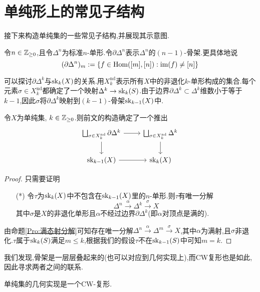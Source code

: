 \section{单纯形上的常见子结构}
接下来构造单纯集的一些常见子结构,并展现其示意图.
\begin{definition}
    令$n \in \mathbb{Z}_{\geq 0}$,且令$\Delta^n$为标准$n$-单形.令$\partial \Delta^n$表示$\Delta^n$的$(n-1)$-骨架.更具体地说
    \[
    (\partial \Delta^n)_m := \{f\in \operatorname{Hom}([m],[n]) : \operatorname{im} (f) \neq [n]\}
    \]
\end{definition}
可以探讨$\partial \Delta^k$与$\operatorname{sk}_k(X)$的关系.用$X^{\operatorname{nd}}_k$表示所有$X$中的非退化$k$-单形构成的集合.每个元素$\sigma \in X^{\operatorname{nd}}_k$都确定了一个映射$\Delta^k \to \operatorname{sk}_k(S)$.由于边界$\partial \Delta^k\subset \Delta^k$维数小于等于$k-1$,因此$\sigma$将$\partial \Delta^k$映射到$(k-1)$-骨架$\operatorname{sk}_{k-1}(X)$中.
\begin{proposition}\label{命题:骨架构造}
    令$X$为单纯集, $k \in \mathbb{Z}_{\geq 0}$.则前文的构造确定了一个推出
    \[\begin{tikzcd}
	{\bigsqcup_{\sigma\in X_k^{\operatorname{nd}}}\partial\Delta^k} & {\bigsqcup_{\sigma\in X_k^{\operatorname{nd}}} \Delta^k} \\
	{\sk_{k-1}(X)} & {\sk_{k}(X)}
	\arrow[from=1-1, to=1-2]
	\arrow[from=1-1, to=2-1]
	\arrow[from=1-2, to=2-2]
	\arrow[from=2-1, to=2-2]
    \end{tikzcd}\]
\end{proposition}
\begin{proof}
    只需要证明
    \begin{enumerate}
        \item[(*)] 令$\tau$为$\operatorname{sk}_k(X)$中不包含在$\operatorname{sk}_{k-1}(X)$里的$n$-单形.则$\tau$有唯一分解
        \[
        \Delta^n \xrightarrow{\alpha}\Delta^k \xrightarrow{\sigma} X
        \]
        其中$\sigma$是$X$的非退化单形且$\alpha$不经过边界$\partial \Delta^k$(即$\alpha$对顶点是满的).
    \end{enumerate}
    由命题\ref{Pro:满态射分解}可知存在唯一分解$\Delta^n \xrightarrow{\alpha} \Delta^m \xrightarrow{\sigma}X$,其中$\alpha$为满射,且$\sigma$非退化.$\tau$属于$\operatorname{sk}_k(S)$满足$m \leq k$,根据我们的假设$\tau$不在$\operatorname{sk}_{k-1}(S)$中可知$m = k$.
\end{proof}
我们发现,骨架是一层层叠起来的(也可以对应到几何实现上),而CW复形也是如此,因此寻求两者之间的联系.
\begin{lemma}\label{Lem:单纯集几何实现与CW-复形}
    单纯集的几何实现是一个CW-复形.
\end{lemma}
